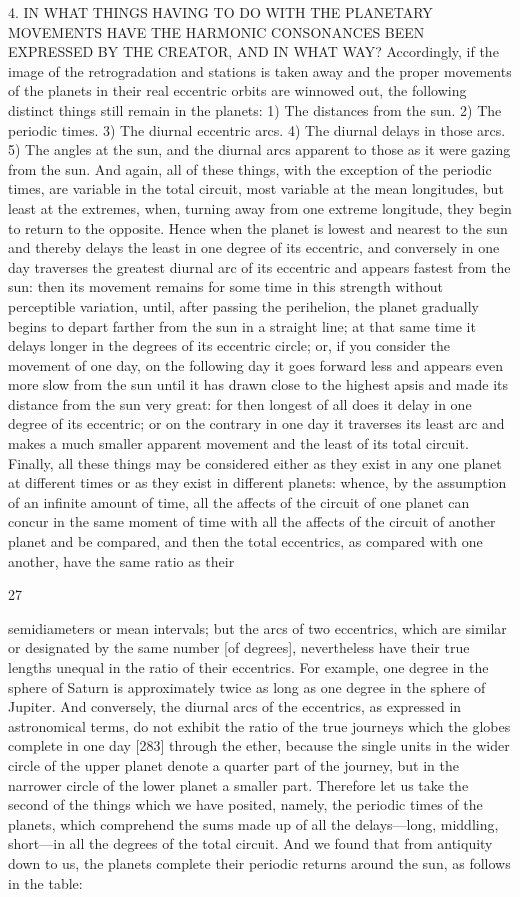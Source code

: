 \documentclass{article}
\begin{document}
4. IN WHAT THINGS HAVING TO DO WITH THE
PLANETARY MOVEMENTS HAVE THE HARMONIC
CONSONANCES BEEN EXPRESSED BY THE
CREATOR, AND IN WHAT WAY?
Accordingly, if the image of the retrogradation and stations is taken away
and the proper movements of the planets in their real eccentric orbits are
winnowed out, the following distinct things still remain in the planets: 1)
The distances from the sun. 2) The periodic times. 3) The diurnal
eccentric arcs. 4) The diurnal delays in those arcs. 5) The angles at the
sun, and the diurnal arcs apparent to those as it were gazing from the
sun. And again, all of these things, with the exception of the periodic
times, are variable in the total circuit, most variable at the mean
longitudes, but least at the extremes, when, turning away from one
extreme longitude, they begin to return to the opposite. Hence when the
planet is lowest and nearest to the sun and thereby delays the least in
one degree of its eccentric, and conversely in one day traverses the
greatest diurnal arc of its eccentric and appears fastest from the sun:
then its movement remains for some time in this strength
without perceptible variation, until, after passing the perihelion, the
planet gradually begins to depart farther from the sun in a straight line;
at that same time it delays longer in the degrees of its eccentric circle; or,
if you consider the movement of one day, on the following day it goes
forward less and appears even more slow from the sun until it has drawn
close to the highest apsis and made its distance from the sun very great:
for then longest of all does it delay in one degree of its eccentric; or on
the contrary in one day it traverses its least arc and makes a much
smaller apparent movement and the least of its total circuit.
Finally, all these things may be considered either as they exist in any one
planet at different times or as they exist in different planets: whence, by
the assumption of an infinite amount of time, all the affects of the circuit
of one planet can concur in the same moment of time with all the affects
of the circuit of another planet and be compared, and then the total
eccentrics, as compared with one another, have the same ratio as their


27

semidiameters or mean intervals; but the arcs of two eccentrics, which
are similar or designated by the same number [of degrees], nevertheless
have their true lengths unequal in the ratio of their eccentrics. For
example, one degree in the sphere of Saturn is approximately twice as
long as one degree in the sphere of Jupiter. And conversely, the diurnal
arcs of the eccentrics, as expressed in astronomical terms, do not exhibit
the ratio of the true journeys which the globes complete in one day [283]
through the ether, because the single units in the wider circle of the
upper planet denote a quarter part of the journey, but in the narrower
circle of the lower planet a smaller part.
Therefore let us take the second of the things which we have posited,
namely, the periodic times of the planets, which comprehend the sums
made up of all the delays—long, middling, short—in all the degrees of the
total circuit. And we found that from antiquity down to us, the planets
complete their periodic returns around the sun, as follows in the table:
\end{document}

